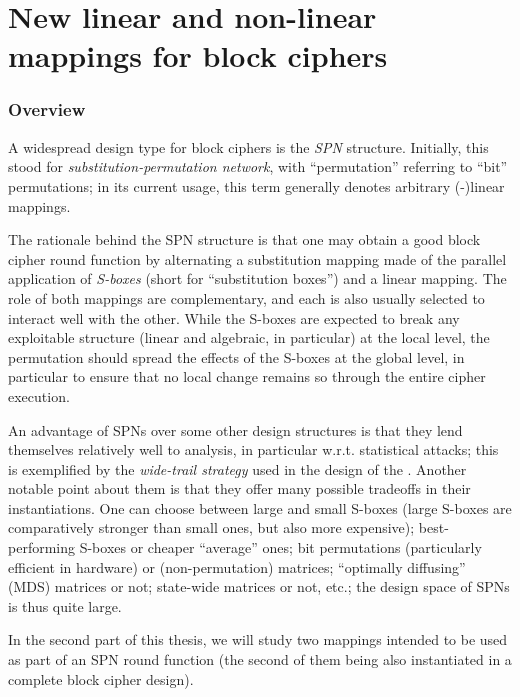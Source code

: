 \part[Nouvelles constructions linéaires et non-linéaires pour chiffres par bloc]
	{New linear and non-linear mappings for block ciphers}
\label{part:constructions}

\section*{Overview}

A widespread design type for block ciphers is the \emph{SPN} structure. Initially, this stood for \emph{substitution-permutation network},
with ``permutation'' referring to ``bit'' permutations; in its current usage, this term generally denotes arbitrary (\ftwo-)linear
mappings.

The rationale behind the SPN structure is that one may obtain a good block cipher round function by alternating a substitution
mapping made of the parallel application of \emph{S-boxes} (short for ``substitution boxes'') and a linear mapping. The role
of both mappings are complementary, and each is also usually selected to interact well with the other. While the S-boxes
are expected to break any exploitable structure (linear and algebraic, in particular) at the local level, the permutation
should spread the effects of the S-boxes at the global level, in particular to ensure that no local change remains so through
the entire cipher execution.

An advantage of SPNs over some other design structures is that they lend themselves relatively well to analysis, in particular w.r.t.
statistical attacks; this is exemplified by the \emph{wide-trail strategy} used in the design of the \aes. Another notable point
about them is that they offer many possible tradeoffs in their instantiations. One can choose between large and small S-boxes
(large S-boxes are comparatively stronger than small ones, but also more expensive); best-performing S-boxes or cheaper
``average'' ones; bit permutations (particularly efficient in hardware) or (non-permutation) matrices; ``optimally diffusing'' (MDS)
matrices or not; state-wide matrices or not, etc.; the design space of SPNs is thus quite large.

\bigskip

In the second part of this thesis, we will study two mappings intended to be used as part of an SPN round function (the second
of them being also instantiated in a complete block cipher design).

